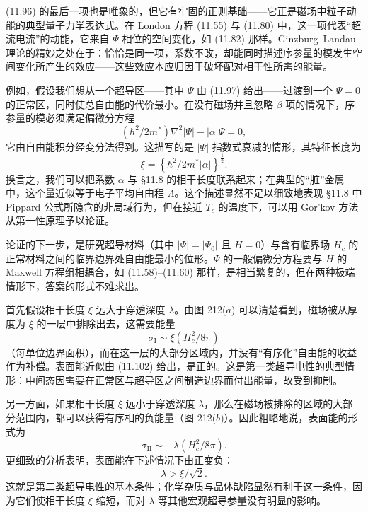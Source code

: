 (11.96) 的最后一项也是唯象的，但它有牢固的正则基础——它正是磁场中粒子动能的典型量子力学表达式。在 London 方程 (11.55) 与 (11.80) 中，这一项代表“超流电流”的动能，它来自 $\Psi$ 相位的空间变化，如 (11.82) 那样。Ginzburg--Landau 理论的精妙之处在于：恰恰是同一项，系数不改，却能同时描述序参量的模发生空间变化所产生的效应——这些效应本应归因于破坏配对相干性所需的能量。

例如，假设我们想从一个超导区——其中 $\Psi$ 由 (11.97) 给出——过渡到一个 $\Psi = 0$ 的正常区，同时使总自由能的代价最小。在没有磁场并且忽略 $\beta$ 项的情况下，序参量的模必须满足偏微分方程
\begin{equation*}
(\hbar^{2}/2m^{*})\nabla^{2}|\Psi| - |\alpha|\Psi = 0,
\tag{11.100}
\end{equation*}
它由自由能积分经变分法得到。这描写的是 $|\Psi|$ 指数式衰减的情形，其特征长度为
\begin{equation*}
\xi = \left\{\hbar^{2}/2m^{*}|\alpha|\right\}^{\frac{1}{2}}.
\tag{11.101}
\end{equation*}
换言之，我们可以把系数 $\alpha$ 与 §11.8 的相干长度联系起来；在典型的“脏”金属中，这个量近似等于电子平均自由程 $\Lambda$。这个描述显然不足以细致地表现 §11.8 中 Pippard 公式所隐含的非局域行为，但在接近 $T_c$ 的温度下，可以用 Gor'kov 方法从第一性原理予以论证。

论证的下一步，是研究超导材料（其中 $|\Psi| = |\Psi_0|$ 且 $H = 0$）与含有临界场 $H_c$ 的正常材料之间的临界边界处自由能最小的位形。$\Psi$ 的一般偏微分方程要与 $H$ 的 Maxwell 方程组相耦合，如 (11.58)–(11.60) 那样，是相当繁复的，但在两种极端情形下，答案的形式不难求出。

首先假设相干长度 $\xi$ 远大于穿透深度 $\lambda$。由图 212($a$) 可以清楚看到，磁场被从厚度为 $\xi$ 的一层中排除出去，这需要能量
\begin{equation*}
\sigma_{\mathrm{I}} \sim \xi(H_c^{2}/8\pi)
\tag{11.102}
\end{equation*}
（每单位边界面积），而在这一层的大部分区域内，并没有“有序化”自由能的收益作为补偿。表面能近似由 (11.102) 给出，是正的。这是第一类超导电性的典型情形：中间态因需要在正常区与超导区之间制造边界而付出能量，故受到抑制。

另一方面，如果相干长度 $\xi$ 远小于穿透深度 $\lambda$，那么在磁场被排除的区域的大部分范围内，都可以获得有序相的负能量（图 212($b$)）。因此粗略地说，表面能的形式为
\begin{equation*}
\sigma_{\mathrm{II}} \sim -\lambda(H_c^{2}/8\pi).
\tag{11.103}
\end{equation*}
更细致的分析表明，表面能在下述情况下由正变负：
\begin{equation*}
\lambda > \xi/\sqrt{2}.
\tag{11.104}
\end{equation*}
这就是第二类超导电性的基本条件；化学杂质与晶体缺陷显然有利于这一条件，因为它们使相干长度 $\xi$ 缩短，而对 $\lambda$ 等其他宏观超导参量没有明显的影响。

